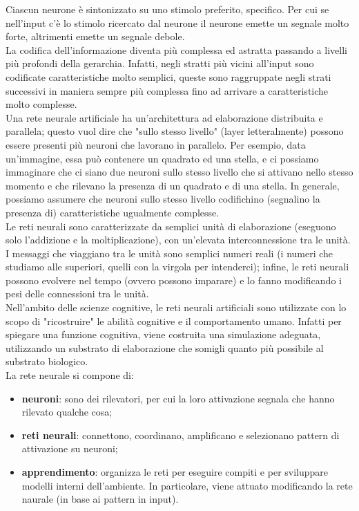 Ciascun neurone è sintonizzato su uno stimolo preferito, specifico. Per cui se
nell'input c'è lo stimolo ricercato dal neurone il neurone emette un segnale
molto forte, altrimenti emette un segnale debole. \\
La codifica dell'informazione diventa più complessa ed astratta passando
a livelli più profondi della gerarchia. Infatti, negli
stratti più vicini all'input sono codificate caratteristiche molto semplici,
queste sono raggruppate negli strati successivi in maniera sempre più complessa
fino ad arrivare a caratteristiche molto complesse.\\
Una rete neurale artificiale ha un'architettura ad elaborazione distribuita e
parallela; questo vuol dire che "sullo stesso livello" (layer letteralmente)
possono essere presenti più neuroni che lavorano in parallelo. Per esempio, data
un'immagine, essa può contenere un quadrato ed una stella, e ci possiamo
immaginare che ci siano due neuroni sullo stesso livello che si attivano nello
stesso momento e che rilevano la presenza di un quadrato e di una stella. In
generale, possiamo assumere che neuroni sullo stesso livello codifichino
(segnalino la presenza di) caratteristiche ugualmente complesse. \\
Le reti neurali
sono caratterizzate da semplici unità di elaborazione (eseguono solo l'addizione
e la moltiplicazione), con un'elevata interconnessione tra le unità. I messaggi
che viaggiano tra le unità sono semplici numeri reali (i numeri che studiamo
alle superiori, quelli con la virgola per intenderci); infine, le reti neurali
possono evolvere nel tempo (ovvero possono imparare) e lo fanno modificando i
pesi delle connessioni tra le unità.\\
Nell'ambito delle scienze cognitive, le reti neurali artificiali sono utilizzate
con lo scopo di "ricostruire" le abilità cognitive e il comportamento umano.
Infatti per spiegare una funzione cognitiva, viene costruita una
simulazione adeguata, utilizzando un substrato di elaborazione che somigli
quanto più possibile al substrato biologico.\\
La rete neurale si compone di:
\begin{itemize}
	\item \textbf{neuroni}: sono dei rilevatori, per cui la loro attivazione 
		segnala che hanno rilevato qualche cosa;

	\item \textbf{reti neurali}: connettono, coordinano, amplificano e 
		selezionano pattern di attivazione su neuroni;

	\item \textbf{apprendimento}: organizza le reti per eseguire compiti e per 
		sviluppare modelli interni dell'ambiente. In particolare, viene attuato 
		modificando la rete naurale (in base ai pattern in input).
\end{itemize}


